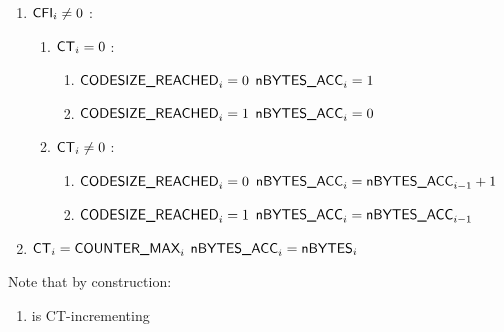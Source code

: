 \begin{enumerate}
	\item \If $\textsf{CFI}_{i} \ne 0$ \Then:
	\begin{enumerate}
		\item \If $\textsf{CT}_{i}=0$ \Then:
		\begin{enumerate}
		 	\item \If $\textsf{CODESIZE\_REACHED}_{i}=0$ \Then $\textsf{nBYTES\_ACC}_{i}=1$
		 	\item \If $\textsf{CODESIZE\_REACHED}_{i}=1$ \Then $\textsf{nBYTES\_ACC}_{i}=0$ 
		\end{enumerate}
		\item \If $\textsf{CT}_{i} \neq 0$ \Then:
		\begin{enumerate}
		 	\item \If $\textsf{CODESIZE\_REACHED}_{i}=0$ \Then $\textsf{nBYTES\_ACC}_{i}=\textsf{nBYTES\_ACC}_{i-1}+1$
		 	\item \If $\textsf{CODESIZE\_REACHED}_{i}=1$ \Then $\textsf{nBYTES\_ACC}_{i}=\textsf{nBYTES\_ACC}_{i-1}$ 
		\end{enumerate} 
	\end{enumerate}
	\item \If $\textsf{CT}_{i}=\textsf{COUNTER\_MAX}_{i}$ \Then $\textsf{nBYTES\_ACC}_{i}=\textsf{nBYTES}_{i}$
\end{enumerate}

Note that by construction:
\begin{enumerate}[resume]
	\item \nBytesAcc{} is CT-incrementing \quad \trash 
\end{enumerate}